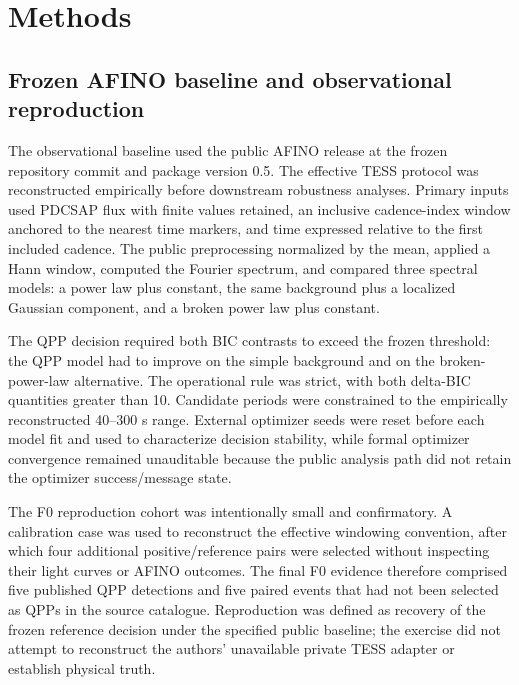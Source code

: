 \documentclass[11pt,a4paper]{article}
\begin{document}
\section{Methods}
\subsection{Frozen AFINO baseline and observational reproduction}
The observational baseline used the public AFINO release at the frozen repository commit and package version 0.5. The effective TESS protocol was reconstructed empirically before downstream robustness analyses. Primary inputs used PDCSAP flux with finite values retained, an inclusive cadence-index window anchored to the nearest time markers, and time expressed relative to the first included cadence. The public preprocessing normalized by the mean, applied a Hann window, computed the Fourier spectrum, and compared three spectral models: a power law plus constant, the same background plus a localized Gaussian component, and a broken power law plus constant.

The QPP decision required both BIC contrasts to exceed the frozen threshold: the QPP model had to improve on the simple background and on the broken-power-law alternative. The operational rule was strict, with both delta-BIC quantities greater than 10. Candidate periods were constrained to the empirically reconstructed 40--300 s range. External optimizer seeds were reset before each model fit and used to characterize decision stability, while formal optimizer convergence remained unauditable because the public analysis path did not retain the optimizer success/message state.

The F0 reproduction cohort was intentionally small and confirmatory. A calibration case was used to reconstruct the effective windowing convention, after which four additional positive/reference pairs were selected without inspecting their light curves or AFINO outcomes. The final F0 evidence therefore comprised five published QPP detections and five paired events that had not been selected as QPPs in the source catalogue. Reproduction was defined as recovery of the frozen reference decision under the specified public baseline; the exercise did not attempt to reconstruct the authors' unavailable private TESS adapter or establish physical truth.
\end{document}
